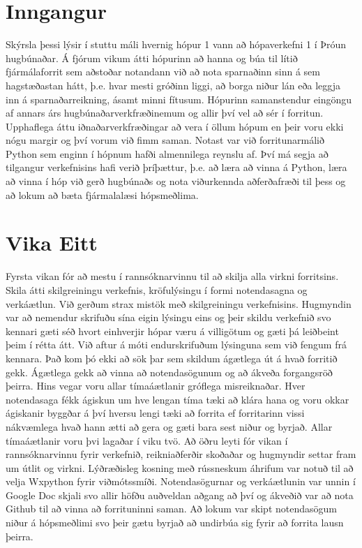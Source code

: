 \documentclass[a4paper,10pt]{article}
\begin{document}

\pagebreak
\linespread{1.5}
\section{Inngangur}
Skýrsla þessi lýsir í stuttu máli hvernig hópur 1 vann að hópaverkefni 1 í Þróun hugbúnaðar.  Á fjórum vikum átti hópurinn að hanna og búa til lítið fjármálaforrit sem aðstoðar notandann við að nota sparnaðinn sinn á sem hagstæðastan hátt, þ.e. hvar mesti gróðinn liggi, að borga niður lán eða leggja inn á sparnaðarreikning, ásamt minni fítusum.  Hópurinn samanstendur eingöngu af annars árs hugbúnaðarverkfræðinemum og allir því vel að sér í forritun.  Upphaflega áttu iðnaðarverkfræðingar að vera í öllum hópum en þeir voru ekki nógu margir og því vorum við fimm saman. Notast var við forritunarmálið Python sem enginn í hópnum hafði almennilega reynslu af.  Því má segja að tilgangur verkefnisins hafi verið þríþættur, þ.e. að læra að vinna á Python, læra að vinna í hóp við gerð hugbúnaðs og nota viðurkennda aðferðafræði til þess og að lokum að bæta fjármalalæsi hópsmeðlima.



\section{Vika Eitt}
Fyrsta vikan fór að mestu í rannsóknarvinnu til að skilja alla virkni forritsins.  Skila átti skilgreiningu verkefnis, kröfulýsingu í formi notendasagna og verkáætlun.  Við gerðum strax mistök með skilgreiningu verkefnisins.  Hugmyndin var að nemendur skrifuðu sína eigin lýsingu eins og þeir skildu verkefnið svo kennari gæti séð hvort einhverjir hópar væru á villigötum og gæti þá leiðbeint þeim í rétta átt.  Við aftur á móti endurskrifuðum lýsinguna sem við fengum frá kennara.  Það kom þó ekki að sök þar sem skildum ágætlega út á hvað forritið gekk.  Ágætlega gekk að vinna að notendasögunum og að ákveða forgangsröð þeirra.  Hins vegar voru allar tímaáætlanir gróflega misreiknaðar.  Hver notendasaga fékk ágiskun um hve lengan tíma tæki að klára hana og voru okkar ágiskanir byggðar á því hversu lengi tæki að forrita ef forritarinn vissi nákvæmlega hvað hann ætti að gera og gæti bara sest niður og byrjað.  Allar tímaáætlanir voru þvi lagaðar í viku tvö.  
Að öðru leyti fór vikan í rannsóknarvinnu fyrir verkefnið, reikniaðferðir skoðaðar og hugmyndir settar fram um útlit og virkni.  Lýðræðisleg kosning með rússneskum áhrifum var notuð til að velja Wxpython fyrir viðmótssmíði.  Notendasögurnar og verkáætlunin var unnin í Google Doc skjali svo allir höfðu auðveldan aðgang að því og ákveðið var að nota Github til að vinna að forrituninni saman.  Að lokum var skipt notendasögum niður á hópsmeðlimi svo þeir gætu byrjað að undirbúa sig fyrir að forrita lausn þeirra.
\end{document}
